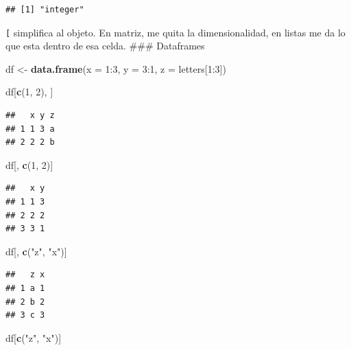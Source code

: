 \documentclass[]{article}
\newenvironment{Shaded}{\begin{snugshade}}{\end{snugshade}}
\newcommand{\KeywordTok}[1]{\textcolor[rgb]{0.13,0.29,0.53}{\textbf{{#1}}}}
\newcommand{\DataTypeTok}[1]{\textcolor[rgb]{0.13,0.29,0.53}{{#1}}}
\newcommand{\DecValTok}[1]{\textcolor[rgb]{0.00,0.00,0.81}{{#1}}}
\newcommand{\StringTok}[1]{\textcolor[rgb]{0.31,0.60,0.02}{{#1}}}
\newcommand{\NormalTok}[1]{{#1}}
\begin{document}
\begin{verbatim}
## [1] "integer"
\end{verbatim}

\texttt{{[}} simplifica al objeto. En matriz, me quita la
dimensionalidad, en listas me da lo que esta dentro de esa celda. \#\#\#
Dataframes

\begin{Shaded}
\begin{Highlighting}[]
\NormalTok{df <-}\StringTok{ }\KeywordTok{data.frame}\NormalTok{(}\DataTypeTok{x =} \DecValTok{1}\NormalTok{:}\DecValTok{3}\NormalTok{, }\DataTypeTok{y =} \DecValTok{3}\NormalTok{:}\DecValTok{1}\NormalTok{, }\DataTypeTok{z =} \NormalTok{letters[}\DecValTok{1}\NormalTok{:}\DecValTok{3}\NormalTok{])}

\NormalTok{df[}\KeywordTok{c}\NormalTok{(}\DecValTok{1}\NormalTok{, }\DecValTok{2}\NormalTok{), ]}
\end{Highlighting}
\end{Shaded}

\begin{verbatim}
##   x y z
## 1 1 3 a
## 2 2 2 b
\end{verbatim}

\begin{Shaded}
\begin{Highlighting}[]
\NormalTok{df[, }\KeywordTok{c}\NormalTok{(}\DecValTok{1}\NormalTok{, }\DecValTok{2}\NormalTok{)]}
\end{Highlighting}
\end{Shaded}

\begin{verbatim}
##   x y
## 1 1 3
## 2 2 2
## 3 3 1
\end{verbatim}

\begin{Shaded}
\begin{Highlighting}[]
\NormalTok{df[, }\KeywordTok{c}\NormalTok{(}\StringTok{"z"}\NormalTok{, }\StringTok{"x"}\NormalTok{)]}
\end{Highlighting}
\end{Shaded}

\begin{verbatim}
##   z x
## 1 a 1
## 2 b 2
## 3 c 3
\end{verbatim}

\begin{Shaded}
\begin{Highlighting}[]
\NormalTok{df[}\KeywordTok{c}\NormalTok{(}\StringTok{"z"}\NormalTok{, }\StringTok{"x"}\NormalTok{)]}
\end{Highlighting}
\end{Shaded}
\end{document}
